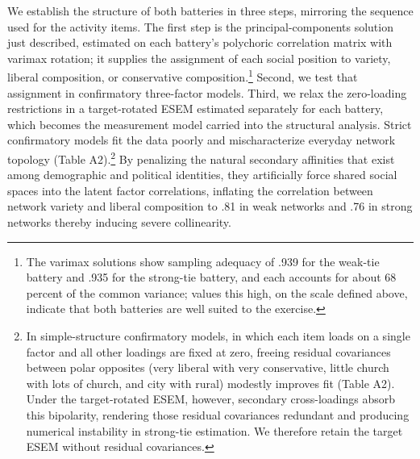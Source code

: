 \documentclass[
  12pt
]{article}
\begin{document}
We establish the structure of both batteries in three steps, mirroring the sequence used for the activity items. The first step is the principal-components solution just described, estimated on each battery's polychoric correlation matrix with varimax rotation; it supplies the assignment of each social position to variety, liberal composition, or conservative composition.\footnote{The varimax solutions show sampling adequacy of .939 for the weak-tie battery and .935 for the strong-tie battery, and each accounts for about 68 percent of the common variance; values this high, on the scale defined above, indicate that both batteries are well suited to the exercise.} Second, we test that assignment in confirmatory three-factor models. Third, we relax the zero-loading restrictions in a target-rotated ESEM estimated separately for each battery, which becomes the measurement model carried into the structural analysis. Strict confirmatory models fit the data poorly and mischaracterize everyday network topology (Table A2).\footnote{In simple-structure confirmatory models, in which each item loads on a single factor and all other loadings are fixed at zero, freeing residual covariances between polar opposites (very liberal with very conservative, little church with lots of church, and city with rural) modestly improves fit (Table A2). Under the target-rotated ESEM, however, secondary cross-loadings absorb this bipolarity, rendering those residual covariances redundant and producing numerical instability in strong-tie estimation. We therefore retain the target ESEM without residual covariances.} By penalizing the natural secondary affinities that exist among demographic and political identities, they artificially force shared social spaces into the latent factor correlations, inflating the correlation between network variety and liberal composition to .81 in weak networks and .76 in strong networks thereby inducing severe collinearity. 
\end{document}
